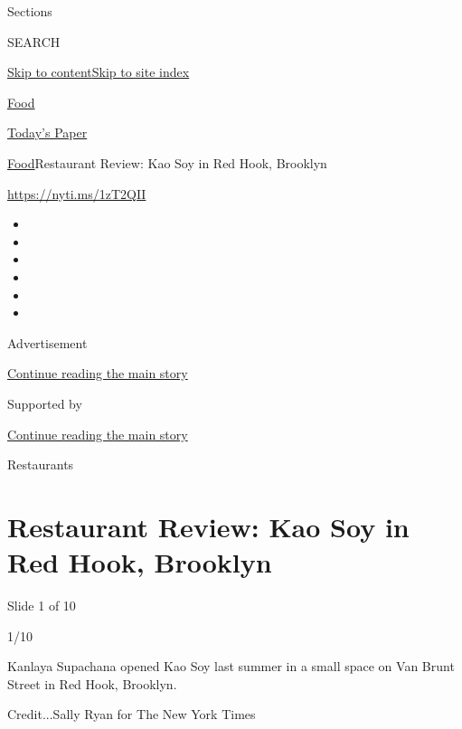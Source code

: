 Sections

SEARCH

\protect\hyperlink{site-content}{Skip to
content}\protect\hyperlink{site-index}{Skip to site index}

\href{https://www.nytimes3xbfgragh.onion/section/food}{Food}

\href{https://myaccount.nytimes3xbfgragh.onion/auth/login?response_type=cookie\&client_id=vi}{}

\href{https://www.nytimes3xbfgragh.onion/section/todayspaper}{Today's
Paper}

\href{/section/food}{Food}\textbar{}Restaurant Review: Kao Soy in Red
Hook, Brooklyn

\url{https://nyti.ms/1zT2QII}

\begin{itemize}
\item
\item
\item
\item
\item
\item
\end{itemize}

Advertisement

\protect\hyperlink{after-top}{Continue reading the main story}

Supported by

\protect\hyperlink{after-sponsor}{Continue reading the main story}

Restaurants

\hypertarget{restaurant-review-kao-soy-in-red-hook-brooklyn}{%
\section{Restaurant Review: Kao Soy in Red Hook,
Brooklyn}\label{restaurant-review-kao-soy-in-red-hook-brooklyn}}

Slide 1 of 10

1/10

Kanlaya Supachana opened Kao Soy last summer in a small space on Van
Brunt Street in Red Hook, Brooklyn.

Credit...Sally Ryan for The New York Times

